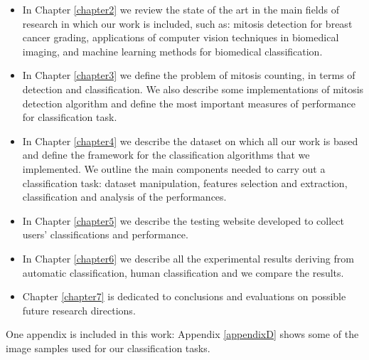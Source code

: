 \begin{itemize}
 \item In Chapter \ref{chapter2} we review the state of the art in the main fields of research in which our 
 work is included, such as: mitosis detection for breast cancer grading, applications of computer vision techniques
 in biomedical imaging, and machine learning methods for biomedical classification.
 \item In Chapter \ref{chapter3} we define the problem of mitosis counting, in terms of detection and classification.
 We also describe some implementations of mitosis detection algorithm and define the most important measures of performance for classification task.
 \item In Chapter \ref{chapter4} we describe the dataset on which all our work is based and define the framework for the classification algorithms that
 we implemented. We outline the main components needed to carry out a classification task: dataset manipulation, features selection and extraction, 
 classification and analysis of the performances.
 \item In Chapter \ref{chapter5} we describe the testing website developed to collect users' classifications and performance.
 \item In Chapter \ref{chapter6} we describe all the experimental results deriving from automatic classification, human classification and we compare
 the results.
 \item Chapter \ref{chapter7} is dedicated to conclusions and evaluations on possible future research directions.
\end{itemize}

One appendix is included in this work: Appendix \ref{appendixD} shows some of the image samples used for our classification tasks.




